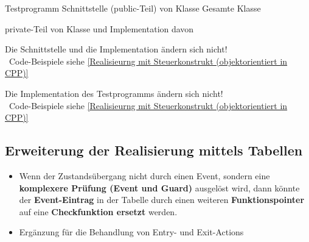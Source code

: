 \begin{minipage}[t]{0.48\columnwidth}
    \raggedright
    
    \vspace{0.1cm}

    \begin{outline}
        \1 Testprogramm 
        \1 Schnittstelle (public-Teil) von Klasse 
        \1 Gesamte Klasse 
    \end{outline}
\end{minipage}
\hfill
\begin{minipage}[t]{0.48\columnwidth}
    \raggedright
    
    \vspace{0.1cm}

    \begin{outline}
        \1 private-Teil von Klasse  und Implementation davon
    \end{outline}
\end{minipage}



Die Schnittstelle  und die Implementation  ändern sich nicht! \\
\textrightarrow\ Code-Beispiele siehe \ref{Realisieurng mit Steuerkonstrukt (objektorientiert in CPP)}


 



Die Implementation des Testprogramms  ändern sich nicht! \\
\textrightarrow\ Code-Beispiele siehe \ref{Realisieurng mit Steuerkonstrukt (objektorientiert in CPP)}


\subsection{Erweiterung der Realisierung mittels Tabellen}

\begin{itemize}
    \item Wenn der Zustandsübergang nicht durch einen Event, sondern eine \textbf{komplexere Prüfung (Event und Guard)} ausgelöst wird, 
        dann könnte der \textbf{Event-Eintrag} in der Tabelle durch einen weiteren \textbf{Funktionspointer} auf eine 
        \textbf{Checkfunktion ersetzt} werden.
    \item Ergänzung für die Behandlung von Entry- und Exit-Actions
\end{itemize}


